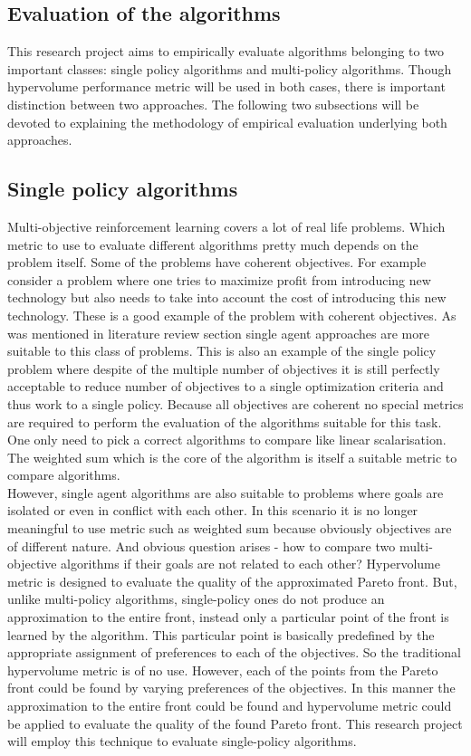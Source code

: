 \subsection{Evaluation of the algorithms}

This research project aims to empirically evaluate algorithms belonging to two important classes: single policy algorithms and multi-policy algorithms. Though hypervolume performance metric will be used in both cases, there is important distinction between two approaches. The following two subsections will be devoted to explaining the methodology of empirical evaluation underlying both approaches.

\subsection{Single policy algorithms}

Multi-objective reinforcement learning covers a lot of real life problems. Which metric to use to evaluate different algorithms pretty much depends on the problem itself. Some of the problems have coherent objectives. For example consider a problem where one tries to maximize profit from introducing new technology but also needs to take into account the cost of introducing this new technology. These is a good example of the problem with coherent objectives. As was mentioned in literature review section single agent approaches are more suitable to this class of problems. This is also an example of the single policy problem where despite of the multiple number of objectives it is still perfectly acceptable to reduce number of objectives to a single optimization criteria and thus work to a single policy. Because all objectives are coherent no special metrics are required to perform the evaluation of the algorithms suitable for this task. One only need to pick a correct algorithms to compare like linear scalarisation. The weighted sum which is the core of the algorithm is itself a suitable metric to compare algorithms. \\

However, single agent algorithms are also suitable to problems where goals are isolated or even in conflict with each other. In this scenario it is no longer meaningful to use metric such as weighted sum because obviously objectives are of different nature. And obvious question arises - how to compare two multi-objective algorithms if their goals are not related to each other? Hypervolume metric is designed to evaluate the quality of the approximated Pareto front. But, unlike multi-policy algorithms, single-policy ones do not produce an approximation to the entire front, instead only a particular point of the front is learned by the algorithm. This particular point is basically predefined by the appropriate assignment of preferences to each of the objectives. So the traditional hypervolume metric is of no use. However, each of the points from the Pareto front could be found by varying preferences of the objectives. In this manner the approximation to the entire front could be found and hypervolume metric could be applied to evaluate the quality of the found Pareto front. This research project will employ this technique to evaluate single-policy algorithms. \\

